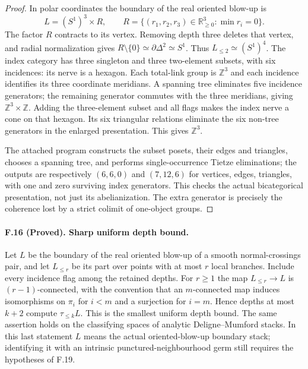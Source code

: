 \begin{proof}
In polar coordinates the boundary of the real oriented blow-up is
\[
 L=(S^1)^3\times R,\qquad
 R=\{(r_1,r_2,r_3)\in\mathbb R_{\geq0}^3:\min r_i=0\}.
\]
The factor $R$ contracts to its vertex. Removing depth three deletes
that vertex, and radial normalization gives $R\setminus\{0\}\simeq
\partial\Delta^2\simeq S^1$. Thus $L_{\leq2}\simeq(S^1)^4$.
The index category has three singleton and three two-element subsets,
with six incidences: its nerve is a hexagon. Each total-link group is
$\mathbb Z^3$ and each incidence identifies its three coordinate
meridians. A spanning tree eliminates five incidence generators; the
remaining generator commutes with the three meridians, giving
$\mathbb Z^3\times\mathbb Z$. Adding the three-element subset and all
flags makes the index nerve a cone on that hexagon. Its six triangular
relations eliminate the six non-tree generators in the enlarged
presentation. This gives $\mathbb Z^3$.

The attached program constructs the subset posets, their edges and
triangles, chooses a spanning tree, and performs single-occurrence
Tietze eliminations; the outputs are respectively $(6,6,0)$ and
$(7,12,6)$ for vertices, edges, triangles, with one and zero surviving
index generators. This checks the actual bicategorical presentation,
not just its abelianization. The extra generator is precisely the
coherence lost by a strict colimit of one-object groups.
\end{proof}

\paragraph{F.16 (Proved). Sharp uniform depth bound.}
Let $L$ be the boundary of the real oriented blow-up of a smooth
normal-crossings pair, and let $L_{\leq r}$ be its part over points
with at most $r$ local branches. Include every incidence flag among
the retained depths. For $r\geq1$ the map
$L_{\leq r}\to L$ is $(r-1)$-connected, with the convention that an
$m$-connected map induces isomorphisms on $\pi_i$ for $i<m$ and a
surjection for $i=m$. Hence depths at most $k+2$ compute
$\tau_{\leq k}L$. This is the smallest uniform depth bound. The same
assertion holds on the classifying spaces of analytic
Deligne--Mumford stacks. In this last statement $L$ means the actual
oriented-blow-up boundary stack; identifying it with an intrinsic
punctured-neighbourhood germ still requires the hypotheses of F.19.

